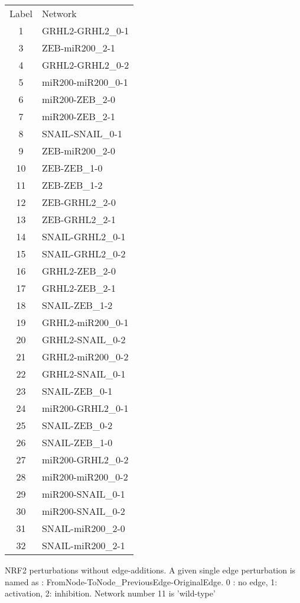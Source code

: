 \documentclass[preprint,review,12pt]{elsarticle}
\begin{document}
{\begin{table}[h]
			\begin{tabular}{cl}
				Label & Network \\
				1     & GRHL2-GRHL2\_0-1 \\
				3     & ZEB-miR200\_2-1 \\
				4     & GRHL2-GRHL2\_0-2 \\
				5     & miR200-miR200\_0-1 \\
				6     & miR200-ZEB\_2-0 \\
				7     & miR200-ZEB\_2-1 \\
				8     & SNAIL-SNAIL\_0-1 \\
				9     & ZEB-miR200\_2-0 \\
				10    & ZEB-ZEB\_1-0 \\
				11    & ZEB-ZEB\_1-2 \\
				12    & ZEB-GRHL2\_2-0 \\
				13    & ZEB-GRHL2\_2-1 \\
				14    & SNAIL-GRHL2\_0-1 \\
				15    & SNAIL-GRHL2\_0-2 \\
				16    & GRHL2-ZEB\_2-0 \\
				17    & GRHL2-ZEB\_2-1 \\
				18    & SNAIL-ZEB\_1-2 \\
				19    & GRHL2-miR200\_0-1 \\
				20    & GRHL2-SNAIL\_0-2 \\
				21    & GRHL2-miR200\_0-2 \\
				22    & GRHL2-SNAIL\_0-1 \\
				23    & SNAIL-ZEB\_0-1 \\
				24    & miR200-GRHL2\_0-1 \\
				25    & SNAIL-ZEB\_0-2 \\
				26    & SNAIL-ZEB\_1-0 \\
				27    & miR200-GRHL2\_0-2 \\
				28    & miR200-miR200\_0-2 \\
				29    & miR200-SNAIL\_0-1 \\
				30    & miR200-SNAIL\_0-2 \\
				31    & SNAIL-miR200\_2-0 \\
				32    & SNAIL-miR200\_2-1 \\
			\end{tabular}%
			\label{tables1}%
		\end{table}%
		\begin{table}[h]
			\caption{NRF2 perturbations without edge-additions. A given single edge perturbation is named as : FromNode-ToNode\_PreviousEdge-OriginalEdge. 0 : no edge, 1: activation, 2: inhibition. Network number 11 is 'wild-type'}

\end{table}}
\end{document}
